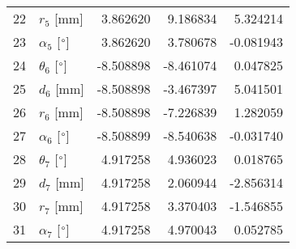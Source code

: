 \documentclass{standalone}%
\begin{document}
\begin{tabular}{llrrr}
22 &              $r_{5}$ [mm] &  3.862620 &   9.186834 &   5.324214 \\
23 &  $\alpha_{5}$ [$\degree$] &  3.862620 &   3.780678 &  -0.081943 \\
24 &  $\theta_{6}$ [$\degree$] & -8.508898 &  -8.461074 &   0.047825 \\
25 &              $d_{6}$ [mm] & -8.508898 &  -3.467397 &   5.041501 \\
26 &              $r_{6}$ [mm] & -8.508898 &  -7.226839 &   1.282059 \\
27 &  $\alpha_{6}$ [$\degree$] & -8.508899 &  -8.540638 &  -0.031740 \\
28 &  $\theta_{7}$ [$\degree$] &  4.917258 &   4.936023 &   0.018765 \\
29 &              $d_{7}$ [mm] &  4.917258 &   2.060944 &  -2.856314 \\
30 &              $r_{7}$ [mm] &  4.917258 &   3.370403 &  -1.546855 \\
31 &  $\alpha_{7}$ [$\degree$] &  4.917258 &   4.970043 &   0.052785 \\
\bottomrule
\end{tabular}
%
\end{document}
